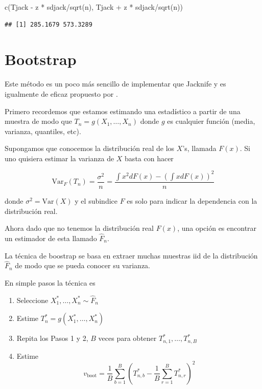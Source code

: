 \documentclass[
  12pt,
]{book}
\newenvironment{Shaded}{\begin{snugshade}}{\end{snugshade}}
\newcommand{\FunctionTok}[1]{\textcolor[rgb]{0.00,0.00,0.00}{#1}}
\newcommand{\NormalTok}[1]{#1}
\newcommand{\SpecialCharTok}[1]{\textcolor[rgb]{0.00,0.00,0.00}{#1}}
\providecommand{\tightlist}{%
  \setlength{\itemsep}{0pt}\setlength{\parskip}{0pt}}
\theoremstyle{definition}
\theoremstyle{definition}
\theoremstyle{definition}
\theoremstyle{remark}
\begin{document}
\begin{Shaded}
\begin{Highlighting}[]
\FunctionTok{c}\NormalTok{(Tjack }\SpecialCharTok{{-}}\NormalTok{ z }\SpecialCharTok{*}\NormalTok{ sdjack}\SpecialCharTok{/}\FunctionTok{sqrt}\NormalTok{(n), Tjack }\SpecialCharTok{+}\NormalTok{ z }\SpecialCharTok{*}\NormalTok{ sdjack}\SpecialCharTok{/}\FunctionTok{sqrt}\NormalTok{(n))}
\end{Highlighting}
\end{Shaded}

\begin{verbatim}
## [1] 285.1679 573.3289
\end{verbatim}

\hypertarget{bootstrap}{%
\section{Bootstrap}\label{bootstrap}}

Este método es un poco más sencillo de implementar que Jacknife y es
igualmente de eficaz propuesto por \cite{Efron1979}.

Primero recordemos que estamos estimando una estadístico a partir de
una muestra de modo que \(T_{n}=g\left( X_{1},\ldots,X_{n} \right)\)
donde \(g\) es cualquier función (media, varianza, quantiles, etc).

Supongamos que conocemos la distribución real de los \(X\)'s, llamada \(F(x)\). Si uno
quisiera estimar la varianza de \(X\) basta con hacer

\begin{equation*}
\mathrm{Var}_{F}\left(T_{n}\right)
= \frac{\sigma^{2}}{n}=\frac{\int x^{2}  dF(x)-\left(\int x
dF(x)\right)^{2}}{n}
\end{equation*}

donde \(\sigma^{2} = \mathrm{Var}\left(X\right)\) y el subindice \(F\) es solo para indicar la dependencia con la distribución real.

Ahora dado que no tenemos la distribución real \(F(x)\), una opción es encontrar un estimador de esta llamado \(\hat{F}_n\).

La técnica de boostrap se basa en extraer muchas muestras iid de la distribución \(\hat{F}_n\) de modo que se pueda conocer su varianza.

En simple pasos la técnica es

\begin{enumerate}
\def\labelenumi{\arabic{enumi}.}
\tightlist
\item
  Seleccione \(X_{1}^{*}, \ldots, X_{n}^{*} \sim \widehat{F}_{n}\)
\item
  Estime \(T_{n}^{*}=g\left(X_{1}^{*}, \ldots, X_{n}^{*}\right)\)
\item
  Repita los Pasos 1 y 2, \(B\) veces para obtener \(T_{n, 1}^{*}, \ldots, T_{n, B}^{*}\)
\item
  Estime
  \[
  v_{\mathrm{boot}}=\frac{1}{B} \sum_{b=1}^{B}\left(T_{n, b}^{*}-\frac{1}{B} \sum_{r=1}^{B} T_{n, r}^{*}\right)^{2}
  \]
\end{enumerate}
\end{document}

